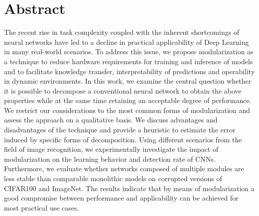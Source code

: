 \section*{Abstract}

The recent rise in task complexity coupled with the inherent shortcomings of neural networks have led to a decline in practical applicability of Deep Learning in many real-world scenarios. To address this issue, we propose modularization as a technique to reduce hardware requirements for training and inference of models and to facilitate knowledge transfer, interpretability of predictions and operability in dynamic environments. In this work, we examine the central question whether it is possible to decompose a conventional neural network to obtain the above properties while at the same time retaining an acceptable degree of performance. We restrict our considerations to the most common forms of modularization and assess the approach on a qualitative basis. We discuss advantages and disadvantages of the technique and provide a heuristic to estimate the error induced by specific forms of decomposition. Using different scenarios from the field of image recognition, we experimentally investigate the impact of modularization on the learning behavior and detection rate of CNNs. Furthermore, we evaluate whether networks composed of multiple modules are less stable than comparable monolithic models on corrupted versions of CIFAR100 and ImageNet. The results indicate that by means of modularization a good compromise between performance and applicability can be achieved for most practical use cases.